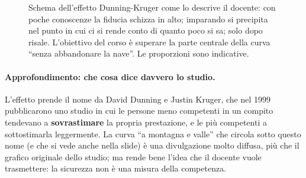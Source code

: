 \begin{figure}[htbp]
\centering
{}
\caption{Schema dell'effetto Dunning-Kruger come lo descrive il docente: con
poche conoscenze la fiducia schizza in alto; imparando si precipita nel punto
in cui ci si rende conto di quanto poco si sa; solo dopo risale. L'obiettivo
del corso è superare la parte centrale della curva ``senza abbandonare la
nave''. Le proporzioni sono indicative.}
\label{gd8:fig:dk}
\end{figure}

\paragraph{Approfondimento: che cosa dice davvero lo studio.} L'effetto prende
il nome da David Dunning e Justin Kruger, che nel 1999 pubblicarono uno studio
in cui le persone meno competenti in un compito tendevano a
\textbf{sovrastimare} la propria prestazione, e le più competenti a
sottostimarla leggermente. La curva ``a montagna e valle'' che circola sotto
questo nome (e che si vede anche nella slide) è una divulgazione molto
diffusa, più che il grafico originale dello studio; ma rende bene l'idea che
il docente vuole trasmettere: la sicurezza non è una misura della competenza.

